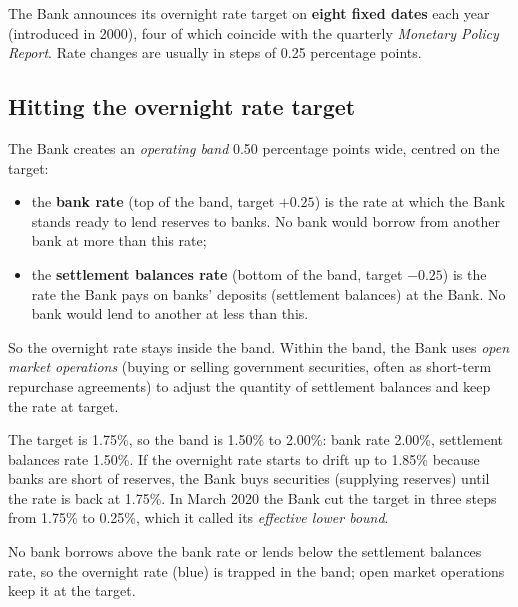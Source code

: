 The Bank announces its overnight rate target on \textbf{eight fixed dates} each year
(introduced in 2000), four of which coincide with the quarterly \emph{Monetary Policy
Report}. Rate changes are usually in steps of 0.25 percentage points.

\subsection{Hitting the overnight rate target}

The Bank creates an \emph{operating band} 0.50 percentage points wide, centred on the
target:
\begin{itemize}
  \item the \textbf{bank rate} (top of the band, target $+ 0.25$) is the rate at which the
        Bank stands ready to lend reserves to banks. No bank would borrow from another bank
        at more than this rate;
  \item the \textbf{settlement balances rate} (bottom of the band, target $- 0.25$) is the
        rate the Bank pays on banks' deposits (settlement balances) at the Bank. No bank
        would lend to another at less than this.
\end{itemize}
So the overnight rate stays inside the band. Within the band, the Bank uses \emph{open
market operations} (buying or selling government securities, often as short-term
repurchase agreements) to adjust the quantity of settlement balances and keep the rate at
target.

\begin{example}
The target is 1.75\%, so the band is 1.50\% to 2.00\%: bank rate 2.00\%, settlement
balances rate 1.50\%. If the overnight rate starts to drift up to 1.85\% because banks
are short of reserves, the Bank buys securities (supplying reserves) until the rate is
back at 1.75\%. In March 2020 the Bank cut the target in three steps from 1.75\% to
0.25\%, which it called its \emph{effective lower bound}.
\end{example}

\begin{center}
\end{center}
No bank borrows above the bank rate or lends below the settlement balances rate, so the
overnight rate (blue) is trapped in the band; open market operations keep it at the target.

